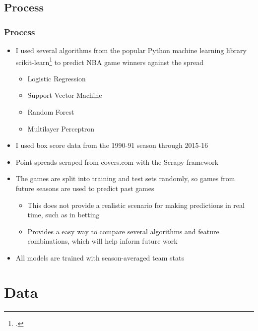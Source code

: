 \documentclass{beamer}
\begin{document}
\subsection{Process}
\begin{frame}
\frametitle{Process}
\begin{itemize}
    \item I used several algorithms from the popular Python machine learning library scikit-learn\footcite{scikit-learn} to predict NBA game winners against the spread
    \begin{itemize}
        \item Logistic Regression
        \item Support Vector Machine
        \item Random Forest
        \item Multilayer Perceptron
    \end{itemize}
    \item I used box score data from the 1990-91 season through 2015-16
    \item Point spreads scraped from covers.com with the Scrapy framework
    \item The games are split into training and test sets randomly, so games from future seasons are used to predict past games
    \begin{itemize}
        \item This does not provide a realistic scenario for making predictions in real time, such as in betting
        \item Provides a easy way to compare several algorithms and feature combinations, which will help inform future work
    \end{itemize}
    \item All models are trained with season-averaged team stats
\end{itemize}
\end{frame}

\section{Data}
\end{document}

